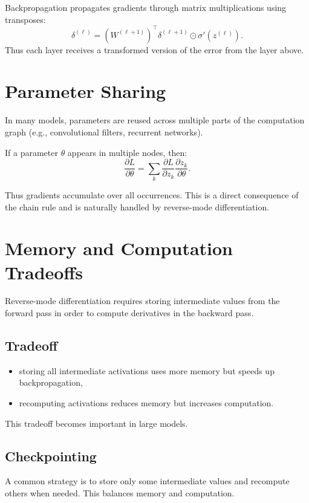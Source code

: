 Backpropagation propagates gradients through matrix multiplications using transposes:
\[
\delta^{(\ell)} = (W^{(\ell+1)})^\top \delta^{(\ell+1)} \odot \sigma'(z^{(\ell)}).
\]
Thus each layer receives a transformed version of the error from the layer above.

\section{Parameter Sharing}

In many models, parameters are reused across multiple parts of the computation graph (e.g., convolutional filters, recurrent networks).

If a parameter $\theta$ appears in multiple nodes, then:
\[
\frac{\partial L}{\partial \theta}
=
\sum_{k} \frac{\partial L}{\partial z_k} \frac{\partial z_k}{\partial \theta}.
\]

Thus gradients accumulate over all occurrences. This is a direct consequence of the chain rule and is naturally handled by reverse-mode differentiation.

\section{Memory and Computation Tradeoffs}

Reverse-mode differentiation requires storing intermediate values from the forward pass in order to compute derivatives in the backward pass.

\subsection{Tradeoff}

\begin{itemize}
    \item storing all intermediate activations uses more memory but speeds up backpropagation,
    \item recomputing activations reduces memory but increases computation.
\end{itemize}

This tradeoff becomes important in large models.

\subsection{Checkpointing}

A common strategy is to store only some intermediate values and recompute others when needed. This balances memory and computation.

